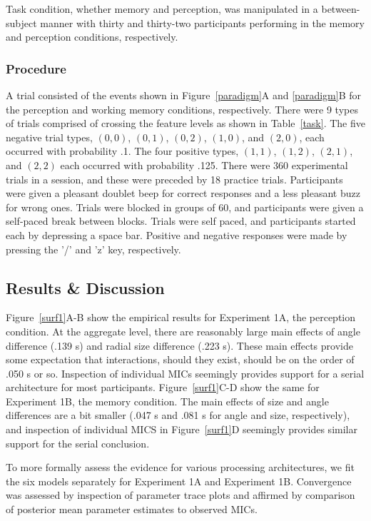 \documentclass[fignum,nobf,man]{apa}
\begin{document}
Task condition, whether memory and perception, was manipulated in a between-subject manner with thirty and thirty-two participants performing in the memory and perception conditions, respectively.  


\subsubsection{Procedure}  A trial consisted of the events shown in Figure~\ref{paradigm}A and \ref{paradigm}B for the perception and working memory conditions, respectively.  There were 9 types of trials comprised of crossing the feature levels as shown in Table~\ref{task}.   The five negative trial types, $(0,0)$, $(0,1)$, $(0,2)$, $(1,0)$, and $(2,0)$, each occurred with probability .1.  The four positive types, $(1,1)$, $(1,2)$, $(2,1)$, and $(2,2)$ each occurred with probability .125.  There were 360 experimental trials in a session, and these were preceded by 18 practice trials.  Participants were given a pleasant doublet beep for correct responses and a less pleasant buzz for wrong ones.  Trials were blocked in groups of 60, and participants were given a self-paced break between blocks.  Trials were self paced, and participants started each by depressing a space bar.  Positive and negative responses were made by pressing the '/' and 'z' key, respectively.


\subsection{Results \& Discussion}
Figure~\ref{surf1}A-B show the empirical results for Experiment 1A, the perception condition.  At the aggregate level, there are reasonably large main effects of angle difference (.139 s) and radial size difference (.223 s).    These main effects provide some expectation that interactions, should they exist, should be on the order of .050 s or so.  Inspection of individual MICs seemingly provides support for a serial architecture for most participants.  Figure~\ref{surf1}C-D show the same for Experiment 1B, the memory condition.  The main effects of size and angle differences are a bit smaller (.047 s and .081 s for angle and size, respectively), and inspection of individual MICS in Figure~\ref{surf1}D seemingly provides similar support for the serial conclusion.

To more formally assess the evidence for various processing architectures, we fit the  six models separately for Experiment 1A and Experiment 1B.  Convergence was assessed by inspection of parameter trace plots and affirmed by comparison of posterior mean parameter estimates to observed MICs.
\end{document}
